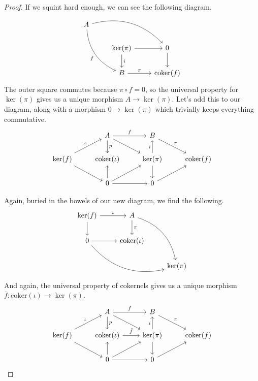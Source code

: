 \documentclass[a4paper]{report}
\newcommand{\coker}{\mathrm{coker}}
\theoremstyle{definition}
\theoremstyle{plain}
\theoremstyle{remark}
\begin{document}
\begin{proof}
  If we squint hard enough, we can see the following diagram.
  \begin{equation*}
    \begin{tikzcd}
      A
      \arrow[rrd, bend left]
      \arrow[rdd, bend right, swap, "f"]
      \\
      & \ker(\pi)
      \arrow[r]
      \arrow[d, "i"]
      & 0
      \arrow[d]
      \\
      & B
      \arrow[r, "\pi"]
      & \coker(f)
    \end{tikzcd}
  \end{equation*}
  The outer square commutes because $\pi \circ f = 0$, so the universal property for $\ker(\pi)$ gives us a unique morphism $A \to \ker(\pi)$. Let's add this to our diagram, along with a morphism $0 \to \ker(\pi)$ which trivially keeps everything commutative.
  \begin{equation*}
    \begin{tikzcd}
      & A
      \arrow[r, "f"]
      \arrow[d, "p"]
      \arrow[dr]
      & B
      \arrow[dr, "\pi"]
      \\
      \ker(f)
      \arrow[ur, "\iota"]
      \arrow[dr]
      & \coker(\iota)
      & \ker(\pi)
      \arrow[u, "i"]
      \arrow[d]
      & \coker(f)
      \\
      & 0
      \arrow[u]
      \arrow[r]
      \arrow[ur]
      & 0
      \arrow[ur]
    \end{tikzcd}
  \end{equation*}

  Again, buried in the bowels of our new diagram, we find the following.
  \begin{equation*}
    \begin{tikzcd}
      \ker(f)
      \arrow[r, "\iota"]
      \arrow[d]
      & A
      \arrow[d, "\pi"]
      \arrow[ddr, bend left]
      \\
      0
      \arrow[r]
      \arrow[drr, bend right]
      & \coker(\iota)
      \\
      & & \ker(\pi)
    \end{tikzcd}
  \end{equation*}
  And again, the universal property of cokernels gives us a unique morphism $\bar{f}\colon \coker(\iota) \to \ker(\pi)$.
  \begin{equation*}
    \begin{tikzcd}
      & A
      \arrow[r, "f"]
      \arrow[d, "p"]
      \arrow[dr]
      & B
      \arrow[dr, "\pi"]
      \\
      \ker(f)
      \arrow[ur, "\iota"]
      \arrow[dr]
      & \coker(\iota)
      \arrow[r, "\bar{f}"]
      & \ker(\pi)
      \arrow[u, "i"]
      \arrow[d]
      & \coker(f)
      \\
      & 0
      \arrow[u]
      \arrow[r]
      \arrow[ur]
      & 0
      \arrow[ur]
    \end{tikzcd}
  \end{equation*}


\end{proof}
\end{document}

